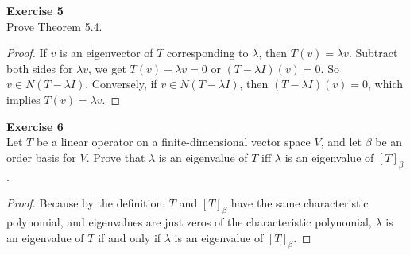 \documentclass[12pt, a4paper]{article}
\theoremstyle{plain}
\newenvironment{exercise}[2][Exercise]
    { \begin{mdframed}[backgroundcolor=gray!20] \textbf{#1 #2} \\}
    {  \end{mdframed}}
\begin{document}
\begin{exercise}{5}
Prove Theorem 5.4.
\end{exercise}
	\begin{proof}
	If $v$ is an eigenvector of $T$ corresponding to $\lambda$, then $T(v)=\lambda v$. Subtract both sides for $\lambda v$, we get $T(v)-\lambda v = 0$ or $(T-\lambda I)(v)=0$. So $v\in N(T-\lambda I)$. Conversely, if $v\in N(T-\lambda I)$, then $(T-\lambda I)(v)=0$, which implies $T(v)=\lambda v$.
	\end{proof}

\begin{exercise}{6}
Let $T$ be a linear operator on a finite-dimensional vector space $V$, and let $\beta$ be an order basis for $V$. Prove that $\lambda$ is an eigenvalue of $T$ iff $\lambda$ is an eigenvalue of $[T]_\beta$.
\end{exercise}
	\begin{proof}
	Because by the definition, $T$ and $[T]_\beta$ have the same characteristic polynomial, and eigenvalues are just zeros of the characteristic polynomial, $\lambda$ is an eigenvalue of $T$ if and only if $\lambda$ is an eigenvalue of $[T]_\beta$.
	\end{proof}
	
\end{document}
